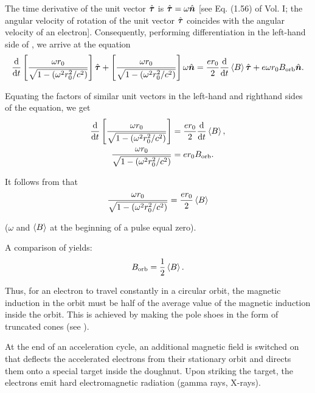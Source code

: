 The time derivative of the unit vector $\hat{\boldsymbol{\tau}}$ is $\hat{\boldsymbol{\tau}}=\omega\hat{\boldsymbol{n}}$ [see Eq. (1.56) of Vol. I; the angular velocity of rotation of the unit vector $\hat{\boldsymbol{\tau}}$ coincides with the angular velocity of an electron].
Consequently, performing differentiation in the left-hand side of , we arrive at the equation
\begin{equation*}
    \dfrac{\mathrm{d}}{\mathrm{d} t}\left[ \frac{\omega r_0}{\sqrt{1 - \left(\omega^2r_0^2/c^2\right)}} \right] \hat{\boldsymbol{\tau}} + \left[ \frac{\omega r_0}{\sqrt{1 - \left(\omega^2r_0^2/c^2\right)}} \right] \omega \hat{\boldsymbol{n}} = \frac{e r_0}{2} \dfrac{\mathrm{d}}{\mathrm{d} t} \left\langle B \right\rangle \hat{\boldsymbol{\tau}} + e \omega r_0 B_{\text{orb}} \hat{\boldsymbol{n}}.
\end{equation*}

\noindent
Equating the factors of similar unit vectors in the left-hand and righthand sides of the equation, we get
\begin{align}
    \dfrac{\mathrm{d}}{\mathrm{d} t}\left[ \frac{\omega r_0}{\sqrt{1 - \left(\omega^2r_0^2/c^2\right)}} \right] &= \frac{e r_0}{2} \dfrac{\mathrm{d}}{\mathrm{d} t} \left\langle B \right\rangle, \label{eq:10_33}\\
    \frac{\omega r_0}{\sqrt{1 - \left(\omega^2r_0^2/c^2\right)}} &= er_0 B_{\text{orb}}. \label{eq:10_34}
\end{align}

\noindent
It follows from  that
\begin{equation}\label{eq:10_35}
    \frac{\omega r_0}{\sqrt{1 - \left(\omega^2r_0^2/c^2\right)}} = \frac{e r_0}{2} \left\langle B \right\rangle
\end{equation}

\noindent
($\omega$ and $\left\langle B \right\rangle$ at the beginning of a pulse equal zero).

A comparison of  yields:
\begin{equation*}
    B_{\text{orb}} = \frac{1}{2} \left\langle B \right\rangle.
\end{equation*}

\noindent
Thus, for an electron to travel constantly in a circular orbit, the magnetic induction in the orbit must be half of the average value of the magnetic induction inside the orbit.
This is achieved by making the pole shoes in the form of truncated cones (see ).

At the end of an acceleration cycle, an additional magnetic field is switched on that deflects the accelerated electrons from their stationary orbit and directs them onto a special target inside the doughnut.
Upon striking the target, the electrons emit hard electromagnetic radiation (gamma rays, X-rays).

